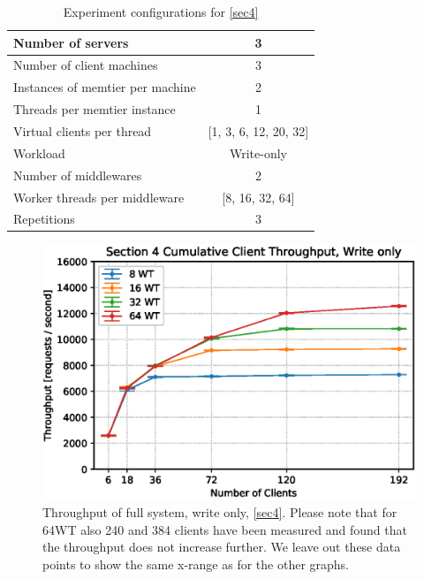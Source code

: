 \documentclass[11pt,a4paper]{article}
\begin{document}
\begin{table}[H]
    \centering
	\begin{tabular}{|l|c|}
		\hline Number of servers                & 3                         \\ 
		\hline Number of client machines        & 3                         \\ 
		\hline Instances of memtier per machine & 2                         \\ 
		\hline Threads per memtier instance     & 1                         \\
		\hline Virtual clients per thread       & [1, 3, 6, 12, 20, 32]     \\ 
		\hline Workload                         & Write-only                \\
		\hline Number of middlewares            & 2                         \\
		\hline Worker threads per middleware    & [8, 16, 32, 64]           \\
		\hline Repetitions                      & 3                         \\ 
		\hline 
	\end{tabular}
	\caption{Experiment configurations for \autoref{sec4}} \label{exp4}
\end{table}

\begin{figure}
    \centering
    \includegraphics[width=0.7\linewidth]{plots/4b_throughputMiddleware.eps}
    \caption{Throughput of full system, write only, \autoref{sec4}. Please note that for 64WT also 240 and 384 clients have been measured and found that the throughput does not increase further. We leave out these data points to show the same x-range as for the other graphs.}
    \label{fig:4-throughput}
\end{figure}
\end{document}
